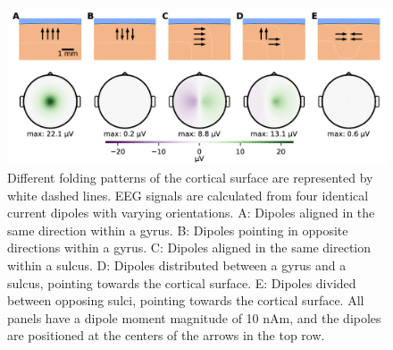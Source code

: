 \documentclass[a4paper, UKenglish, 11pt]{uiomaster}
\begin{document}
\begin{figure}[!htb]
    \centering
    \includegraphics[width=\linewidth]{figures/dipole_orientation.png}
    \caption{Different folding patterns of the cortical surface are represented by white dashed lines. EEG signals are calculated from four identical current dipoles with varying orientations. A: Dipoles aligned in the same direction within a gyrus. B: Dipoles pointing in opposite directions within a gyrus. C: Dipoles aligned in the same direction within a sulcus. D: Dipoles distributed between a gyrus and a sulcus, pointing towards the cortical surface. E: Dipoles divided between opposing sulci, pointing towards the cortical surface.
    All panels have a dipole moment magnitude of 10 nAm, and the dipoles are positioned at the centers of the arrows in the top row.}
    \label{fig:dipole_orientation}
\end{figure}

\end{document}
